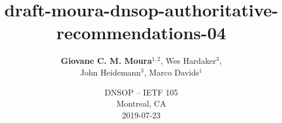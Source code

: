 \documentclass[11pt,show 
notes,notheorems,noamsthm,blank]{beamer} %
\begin{document}
\title{draft-moura-dnsop-authoritative-recommendations-04}  
\author[Moura et. al]{\textbf{Giovane C. M. Moura}$^{1,2}$, Wes Hardaker$^3$, 
\\John Heidemann$^3$, Marco Davids$^1$\\}
\vspace{-0.3cm}


   
   
\date {DNSOP -- IETF 105\\Montreal, CA\\
2019-07-23\\


}  

\frame{\titlepage} 
\end{document}
